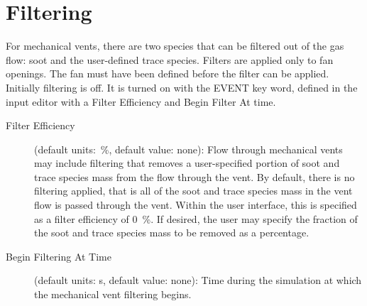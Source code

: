
\section{Filtering}

For mechanical vents, there are two species that can be filtered out of the gas flow: soot and the user-defined trace species. Filters are applied only to fan openings. The fan must have been defined before the filter can be applied. Initially filtering is off. It is turned on with the EVENT key word, defined in the input editor with a Filter Efficiency and Begin Filter At time.

\begin{description}
\item[Filter Efficiency] (default units:~\%, default value: none): Flow through mechanical vents may include filtering that removes a user-specified portion of soot and trace species mass from the flow through the vent.  By default, there is no filtering applied, that is all of the soot and trace species mass in the vent flow is passed through the vent. Within the user interface, this is specified as a filter efficiency of 0~\%.  If desired, the user may specify the fraction of the soot and trace species mass to be removed as a percentage.

\item[Begin Filtering At Time] (default units: s, default value: none): Time during the simulation at which the mechanical vent filtering begins.
\end{description}

